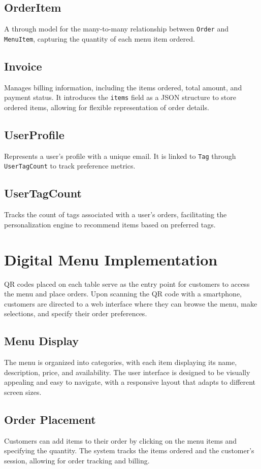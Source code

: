 \subsection{OrderItem}
A through model for the many-to-many relationship between \texttt{Order} and \texttt{MenuItem}, capturing the quantity of each menu item ordered.

\subsection{Invoice}
Manages billing information, including the items ordered, total amount, and payment status. It introduces the \texttt{items} field as a JSON structure to store ordered items, allowing for flexible representation of order details.

\subsection{UserProfile}
Represents a user's profile with a unique email. It is linked to \texttt{Tag} through \texttt{UserTagCount} to track preference metrics.

\subsection{UserTagCount}
Tracks the count of tags associated with a user's orders, facilitating the personalization engine to recommend items based on preferred tags.

\section {Digital Menu Implementation}
QR codes placed on each table serve as the entry point for customers to access the menu and place orders. Upon scanning the QR code with a smartphone, customers are directed to a web interface where they can browse the menu, make selections, and specify their order preferences.
\subsection{Menu Display}
The menu is organized into categories, with each item displaying its name, description, price, and availability. The user interface is designed to be visually appealing and easy to navigate, with a responsive layout that adapts to different screen sizes.
\subsection{Order Placement}
Customers can add items to their order by clicking on the menu items and specifying the quantity. The system tracks the items ordered and the customer's session, allowing for order tracking and billing.
